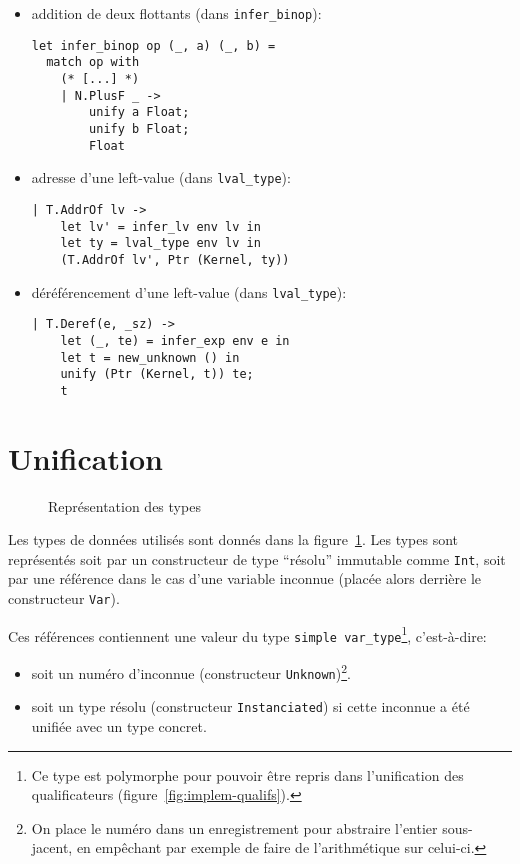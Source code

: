 \begin{itemize}
  \item addition de deux flottants (dans \texttt{infer\_binop}):

\begin{verbatim}
let infer_binop op (_, a) (_, b) =
  match op with
    (* [...] *)
    | N.PlusF _ ->
        unify a Float;
        unify b Float;
        Float
\end{verbatim}

  \item adresse d'une left-value (dans \texttt{lval\_type}):

\begin{verbatim}
| T.AddrOf lv ->
    let lv' = infer_lv env lv in
    let ty = lval_type env lv in
    (T.AddrOf lv', Ptr (Kernel, ty))
\end{verbatim}

  \item déréférencement d'une left-value (dans \texttt{lval\_type}):

\begin{verbatim}
| T.Deref(e, _sz) ->
    let (_, te) = infer_exp env e in
    let t = new_unknown () in
    unify (Ptr (Kernel, t)) te;
    t
\end{verbatim}

\end{itemize}

\section{Unification}

\begin{figure}
\caption{Représentation des types}
\label{fig:implem-typ}
\end{figure}

Les types de données utilisés sont donnés dans la figure~\ref{fig:implem-typ}.
Les types \langname{} sont représentés soit par un constructeur de type
``résolu'' immutable comme \texttt{Int}, soit par une référence dans le cas
d'une variable inconnue (placée alors derrière le constructeur \texttt{Var}).

Ces références contiennent une valeur du type
\texttt{simple var\_type}\footnote{
  Ce type est polymorphe pour pouvoir être repris dans l'unification des
  qualificateurs (figure~\ref{fig:implem-qualifs}).
}, c'est-à-dire:

\begin{itemize}
\item soit un numéro d'inconnue (constructeur \texttt{Unknown})\footnote{On
  place le numéro dans un enregistrement pour abstraire l'entier sous-jacent, en
  empêchant par exemple de faire de l'arithmétique sur celui-ci.}.

\item soit un type résolu (constructeur \texttt{Instanciated}) si cette
  inconnue a été unifiée avec un type concret.
\end{itemize}

